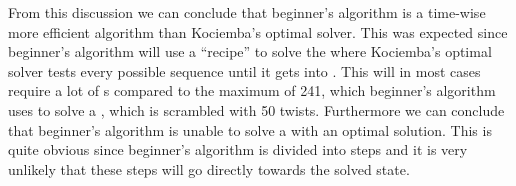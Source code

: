 From this discussion we can conclude that beginner's algorithm is a time-wise more efficient algorithm than Kociemba's optimal solver.
This was expected since beginner's algorithm will use a ``recipe'' to solve the \rubik{} where Kociemba's optimal solver tests every possible \twist{} sequence until it gets into . This will in most cases require a lot of \twist{}s compared to the maximum of 241, which beginner's algorithm uses to solve a \rubik{}, which is scrambled with 50 twists.
Furthermore we can conclude that beginner's algorithm is unable to solve a \rubik{} with an optimal solution.
This is quite obvious since beginner's algorithm is divided into steps and it is very unlikely that these steps will go directly towards the solved state.